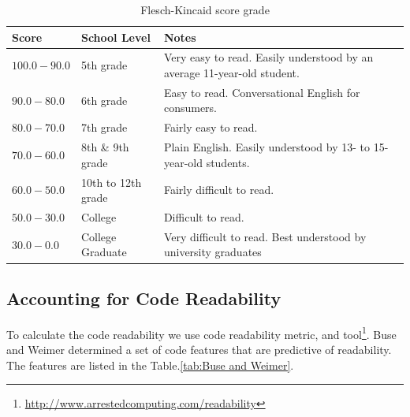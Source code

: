 \documentclass[12pt,mscthesis]{usiinfthesis}
\begin{document}
	\begin {table}[H]
	\begin{center}
    \begin{tabular}{| l | l | p{7cm} | }
    \hline
    \textbf{Score} & \textbf{School Level} & \textbf{Notes} \\ \hline
    $100.0-90.0$ & 5th grade & Very easy to read. Easily understood by an average 11-year-old student.\\ \hline
    $90.0-80.0$ & 6th grade & Easy to read. Conversational English for consumers.\\ \hline
 	$80.0-70.0$ & 7th grade & Fairly easy to read. \\ \hline
	$70.0-60.0$ & 8th \& 9th grade & Plain English. Easily understood by 13- to 15-year-old students.\\ \hline
	$60.0-50.0$ & 10th to 12th grade &  Fairly difficult to read.\\ \hline
	$50.0-30.0$ & College & Difficult to read.\\ \hline
	$30.0-0.0$ & College Graduate & Very difficult to read. Best understood by university graduates\\\hline

    \end{tabular}
	\end{center}
	\caption{Flesch-Kincaid score grade} \label{tab:Flesch-Kincaid} 
	\end{table}

\subsection{Accounting for Code Readability}
	To calculate the code readability we use \citet{Buse:2010:LMC:1850489.1850615} code readability metric, and tool\footnote{\url{http://www.arrestedcomputing.com/readability}}.
	 Buse and Weimer determined a set of code features that are predictive of readability. The features are listed in the Table.\ref{tab:Buse and Weimer}.
\end{document}
